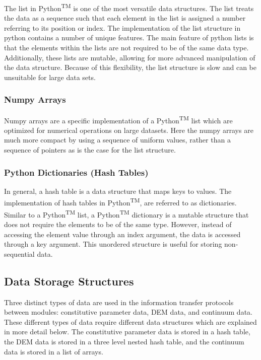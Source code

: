 The list in Python\textsuperscript{TM} is one of the most versatile data structures. The list treats the data as a sequence such that each element in the list is assigned a number referring to its position or index.  The implementation of the list structure in python contains a number of unique features. The main feature of python lists is that the elements within the lists are not required to be of the same data type. Additionally, these lists are mutable, allowing for more advanced manipulation of the data structure. Because of this flexibility, the list structure is slow and can be unsuitable for large data sets. 

\subsubsection*{Numpy Arrays}

Numpy arrays are a specific implementation of a Python\textsuperscript{TM} list which are optimized for numerical operations on large datasets. Here the numpy arrays are much more compact by using a sequence of uniform values, rather than a sequence of pointers as is the case for the list structure.

\subsubsection*{Python Dictionaries (Hash Tables)}

In general, a hash table is a data structure that maps keys to values. The implementation of hash tables in Python\textsuperscript{TM}, are referred to as dictionaries. Similar to a Python\textsuperscript{TM} list, a Python\textsuperscript{TM} dictionary is a mutable structure that does not require the elements to be of the same type. However, instead of accessing the element value through an index argument, the data is accessed through a key argument. This unordered structure is useful for storing non-sequential data.

\subsection{Data Storage Structures}

Three distinct types of data are used in the information transfer protocols between modules: constitutive parameter data, DEM data, and continuum data. These different types of data require different data structures which are explained in more detail below. The constitutive parameter data is stored in a hash table, the DEM data is stored in a three level nested hash table, and the continuum data is stored in a list of arrays.

